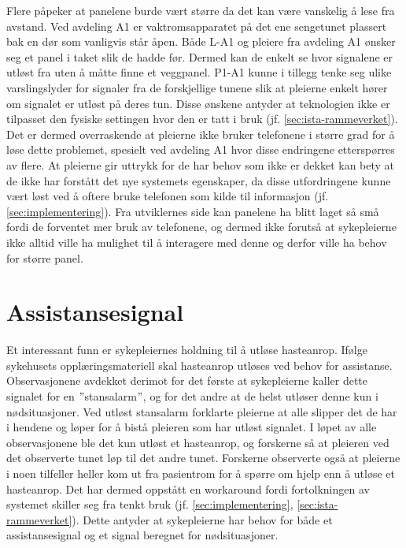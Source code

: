\noindent
Flere påpeker at panelene burde vært større da det kan være vanskelig å lese fra avstand. Ved avdeling A1 er vaktromsapparatet på det ene sengetunet plassert bak en dør som vanligvis står åpen. Både L-A1 og pleiere fra avdeling A1 ønsker seg et panel i taket slik de hadde før. Dermed kan de enkelt se hvor signalene er utløst fra uten å måtte finne et veggpanel. P1-A1 kunne i tillegg tenke seg ulike varslingslyder for signaler fra de forskjellige tunene slik at pleierne enkelt hører om signalet er utløst på deres tun. Disse ønskene antyder at teknologien ikke er tilpasset den fysiske settingen hvor den er tatt i bruk (jf. \ref{sec:ista-rammeverket}). Det er dermed overraskende at pleierne ikke bruker telefonene i større grad for å løse dette problemet, spesielt ved avdeling A1 hvor disse endringene etterspørres av flere. At pleierne gir uttrykk for de har behov som ikke er dekket kan bety at de ikke har forstått det nye systemets egenskaper, da disse utfordringene kunne vært løst ved å oftere bruke telefonen som kilde til informasjon (jf. \ref{sec:implementering}). Fra utviklernes side kan panelene ha blitt laget så små fordi de forventet mer bruk av telefonene, og dermed ikke forutså at sykepleierne ikke alltid ville ha mulighet til å interagere med denne og derfor ville ha behov for større panel.

\section{Assistansesignal}
Et interessant funn er sykepleiernes holdning til å utløse hasteanrop. Ifølge sykehusets opplæringsmateriell skal hasteanrop utløses ved behov for assistanse. Observasjonene avdekket derimot for det første at sykepleierne kaller dette signalet for en $"$stansalarm$"$, og for det andre at de helst utløser denne kun i nødsituasjoner. Ved utløst stansalarm forklarte pleierne at alle slipper det de har i hendene og løper for å bistå pleieren som har utløst signalet. I løpet av alle observasjonene ble det kun utløst et hasteanrop, og forskerne så at pleieren ved det observerte tunet løp til det andre tunet. Forskerne observerte også at pleierne i noen tilfeller heller kom ut fra pasientrom for å spørre om hjelp enn å utløse et hasteanrop. Det har dermed oppstått en workaround fordi fortolkningen av systemet skiller seg fra tenkt bruk (jf. \ref{sec:implementering}, \ref{sec:ista-rammeverket}). Dette antyder at sykepleierne har behov for både et assistansesignal og et signal beregnet for nødsituasjoner.

